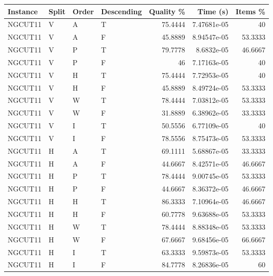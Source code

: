 \begin{tabular}{llllrrr}
    \hline
    Instance & Split & Order & Descending & Quality \% & Time (s)    & Items \% \\
    \hline
    NGCUT11  & V     & A     & T          & 75.4444    & 7.47681e-05 & 40       \\
    NGCUT11  & V     & A     & F          & 45.8889    & 8.94547e-05 & 53.3333  \\
    NGCUT11  & V     & P     & T          & 79.7778    & 8.6832e-05  & 46.6667  \\
    NGCUT11  & V     & P     & F          & 46         & 7.17163e-05 & 40       \\
    NGCUT11  & V     & H     & T          & 75.4444    & 7.72953e-05 & 40       \\
    NGCUT11  & V     & H     & F          & 45.8889    & 8.49724e-05 & 53.3333  \\
    NGCUT11  & V     & W     & T          & 78.4444    & 7.03812e-05 & 53.3333  \\
    NGCUT11  & V     & W     & F          & 31.8889    & 6.38962e-05 & 33.3333  \\
    NGCUT11  & V     & I     & T          & 50.5556    & 6.77109e-05 & 40       \\
    NGCUT11  & V     & I     & F          & 78.5556    & 8.75473e-05 & 53.3333  \\
    NGCUT11  & H     & A     & T          & 69.1111    & 5.68867e-05 & 33.3333  \\
    NGCUT11  & H     & A     & F          & 44.6667    & 8.42571e-05 & 46.6667  \\
    NGCUT11  & H     & P     & T          & 78.4444    & 9.00745e-05 & 53.3333  \\
    NGCUT11  & H     & P     & F          & 44.6667    & 8.36372e-05 & 46.6667  \\
    NGCUT11  & H     & H     & T          & 86.3333    & 7.10964e-05 & 46.6667  \\
    NGCUT11  & H     & H     & F          & 60.7778    & 9.63688e-05 & 53.3333  \\
    NGCUT11  & H     & W     & T          & 78.4444    & 8.88348e-05 & 53.3333  \\
    NGCUT11  & H     & W     & F          & 67.6667    & 9.68456e-05 & 66.6667  \\
    NGCUT11  & H     & I     & T          & 63.3333    & 9.59873e-05 & 53.3333  \\
    NGCUT11  & H     & I     & F          & 84.7778    & 8.26836e-05 & 60       \\

\end{tabular}
